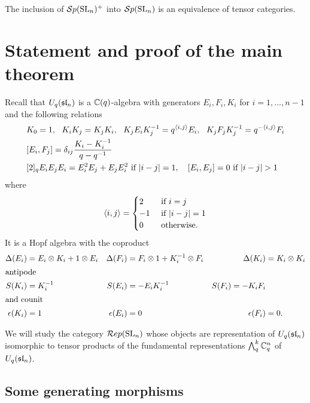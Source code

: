 \documentclass[11pt,leqno]{article}
\begin{document}
\begin{cor}
The inclusion of $\Sp(\SL_n)^+$ into $ \Sp(\SL_n) $ is an equivalence of tensor categories.
\end{cor}

\section{Statement and proof of the main theorem}\label{sec:theorem}

Recall that $U_q(\sl_n) $ is a $ \bC(q)$-algebra with generators $ E_i, F_i, K_i $ for $ i = 1, \dots, n-1 $ and the following relations
\begin{align*}
& K_0=1, \ \ K_iK_j=K_jK_i, \ \ K_jE_iK_j^{-1} = q^{\la i,j \ra} E_i, \ \  K_jF_jK_j^{-1} = q^{-\la i,j \ra} F_i \\
& [E_i,F_j] = \delta_{ij} \frac{K_i - K_i^{-1}}{q-q^{-1}} \\
& [2]_q E_iE_jE_i = E_i^2E_j + E_jE_i^2 \text{ if } |i-j| = 1, \ \ \ [E_i,E_j]=0 \text{ if } |i-j|>1
\end{align*}
where 
$$\la i,j \ra = \begin{cases} 2 & \text{ if } i = j \\ -1 & \text{ if } |i-j|=1 \\ 0 & \text{ otherwise. } \end{cases}$$
It is a Hopf algebra with the coproduct
\begin{align} \label{eq:Hopf}
\Delta(E_i) & = E_i \otimes K_i + 1 \otimes E_i & \Delta(F_i) &= F_i \otimes 1 + K_i^{-1} \otimes F_i & \Delta(K_i) & = K_i \otimes K_i \\
\intertext{antipode}
S(K_i) & = K_i^{-1} & S(E_i) & = -E_iK_i^{-1} & S(F_i) = -K_i F_i \\
\intertext{and counit}
\epsilon(K_i) & = 1 & \epsilon(E_i) & = 0 & \epsilon(F_i) & = 0.
\end{align}


We will study the category $\Rep(\SL_n)$ whose objects are representation of $U_q(\sl_n) $ isomorphic to tensor products of the fundamental representations $\Alt^k_q \bC_q^n$ of $U_q(\sl_n)$.

\subsection{Some generating morphisms}
\label{sec:generating-morphisms}
\end{document}
